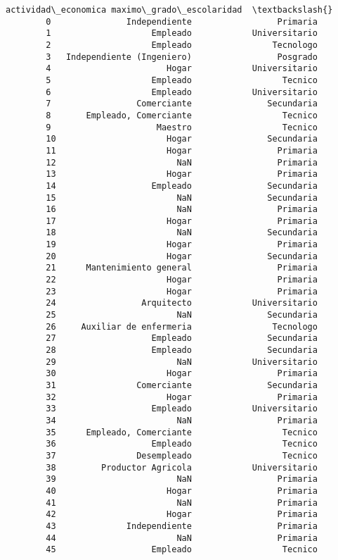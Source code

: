 \documentclass[11pt]{article}
\begin{document}
\begin{Verbatim}[commandchars=\\\{\}]
                  actividad\_economica maximo\_grado\_escolaridad  \textbackslash{}
        0               Independiente                 Primaria   
        1                    Empleado            Universitario   
        2                    Empleado                Tecnologo   
        3   Independiente (Ingeniero)                 Posgrado   
        4                       Hogar            Universitario   
        5                    Empleado                  Tecnico   
        6                    Empleado            Universitario   
        7                 Comerciante               Secundaria   
        8       Empleado, Comerciante                  Tecnico   
        9                     Maestro                  Tecnico   
        10                      Hogar               Secundaria   
        11                      Hogar                 Primaria   
        12                        NaN                 Primaria   
        13                      Hogar                 Primaria   
        14                   Empleado               Secundaria   
        15                        NaN               Secundaria   
        16                        NaN                 Primaria   
        17                      Hogar                 Primaria   
        18                        NaN               Secundaria   
        19                      Hogar                 Primaria   
        20                      Hogar               Secundaria   
        21      Mantenimiento general                 Primaria   
        22                      Hogar                 Primaria   
        23                      Hogar                 Primaria   
        24                 Arquitecto            Universitario   
        25                        NaN               Secundaria   
        26     Auxiliar de enfermeria                Tecnologo   
        27                   Empleado               Secundaria   
        28                   Empleado               Secundaria   
        29                        NaN            Universitario   
        30                      Hogar                 Primaria   
        31                Comerciante               Secundaria   
        32                      Hogar                 Primaria   
        33                   Empleado            Universitario   
        34                        NaN                 Primaria   
        35      Empleado, Comerciante                  Tecnico   
        36                   Empleado                  Tecnico   
        37                Desempleado                  Tecnico   
        38         Productor Agricola            Universitario   
        39                        NaN                 Primaria   
        40                      Hogar                 Primaria   
        41                        NaN                 Primaria   
        42                      Hogar                 Primaria   
        43              Independiente                 Primaria   
        44                        NaN                 Primaria   
        45                   Empleado                  Tecnico   
        

\end{Verbatim}
\end{document}
